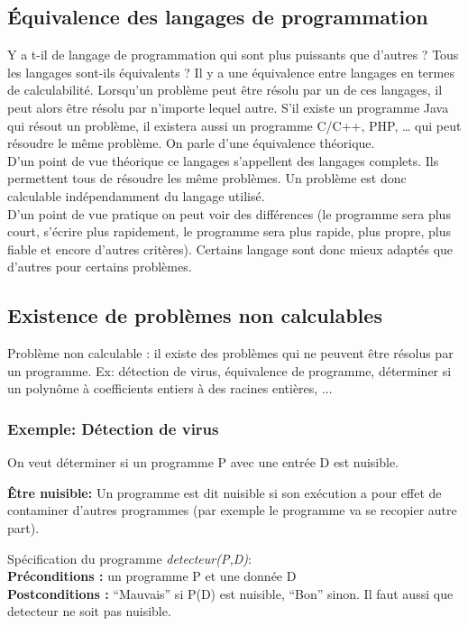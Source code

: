 \subsection{ Équivalence des langages de programmation}
Y a t-il de langage de programmation qui sont plus puissants que d'autres ? Tous les langages sont-ils équivalents ? 
\newline 
Il y a une équivalence entre langages en termes de calculabilité.  Lorsqu'un problème peut être résolu par un de ces langages, il peut alors être résolu par n'importe lequel autre.   
S'il existe un programme Java qui résout un problème, il existera aussi un programme C/C++, PHP, … qui peut résoudre le même problème. On parle d'une équivalence théorique.\\
D'un point de vue théorique ce langages s'appellent des langages complets. Ils permettent tous de résoudre les même problèmes.  Un problème est donc calculable indépendamment du langage utilisé. \\
D'un point de vue pratique on peut voir des différences (le programme sera plus court, s'écrire plus rapidement, le programme sera plus rapide, plus propre, plus fiable et encore d'autres critères).  Certains langage sont donc mieux adaptés que d'autres pour certains problèmes. 


\subsection{Existence de problèmes non calculables}
	Problème non calculable : il existe des problèmes qui ne peuvent
		être résolus par un programme. Ex:
        détection de virus,
        équivalence de programme,
        déterminer si un polynôme à coefficients entiers à des racines entières, ...
	



\subsubsection{Exemple: Détection de virus}
\label{subsubsec:d_tection_de_virus}
On veut déterminer si un programme P avec une entrée D est nuisible.

\textbf{Être nuisible:} Un programme est dit nuisible si son exécution a pour effet de contaminer d'autres programmes (par exemple le programme va se recopier autre part). 

Spécification du programme \textit{detecteur(P,D)}:\\
\textbf{Préconditions :} un programme P et une donnée D\\
\textbf{Postconditions :} ``Mauvais'' si P(D) est nuisible,
		``Bon'' sinon.
Il faut aussi que detecteur ne soit pas nuisible.

